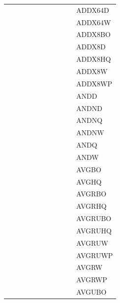 {\begin{tabular}{|l|l|l|l|l|l|l|l|l|l|l|}
 & & & & & & & & & & \textsf{ADDX64D} \\
 & & & & & & & & & & \textsf{ADDX64W} \\
 & & & & & & & & & & \textsf{ADDX8BO} \\
 & & & & & & & & & & \textsf{ADDX8D} \\
 & & & & & & & & & & \textsf{ADDX8HQ} \\
 & & & & & & & & & & \textsf{ADDX8W} \\
 & & & & & & & & & & \textsf{ADDX8WP} \\
 & & & & & & & & & & \textsf{ANDD} \\
 & & & & & & & & & & \textsf{ANDND} \\
 & & & & & & & & & & \textsf{ANDNQ} \\
 & & & & & & & & & & \textsf{ANDNW} \\
 & & & & & & & & & & \textsf{ANDQ} \\
 & & & & & & & & & & \textsf{ANDW} \\
 & & & & & & & & & & \textsf{AVGBO} \\
 & & & & & & & & & & \textsf{AVGHQ} \\
 & & & & & & & & & & \textsf{AVGRBO} \\
 & & & & & & & & & & \textsf{AVGRHQ} \\
 & & & & & & & & & & \textsf{AVGRUBO} \\
 & & & & & & & & & & \textsf{AVGRUHQ} \\
 & & & & & & & & & & \textsf{AVGRUW} \\
 & & & & & & & & & & \textsf{AVGRUWP} \\
 & & & & & & & & & & \textsf{AVGRW} \\
 & & & & & & & & & & \textsf{AVGRWP} \\
 & & & & & & & & & & \textsf{AVGUBO} \\
\hline\end{tabular}
}
\smallskip

